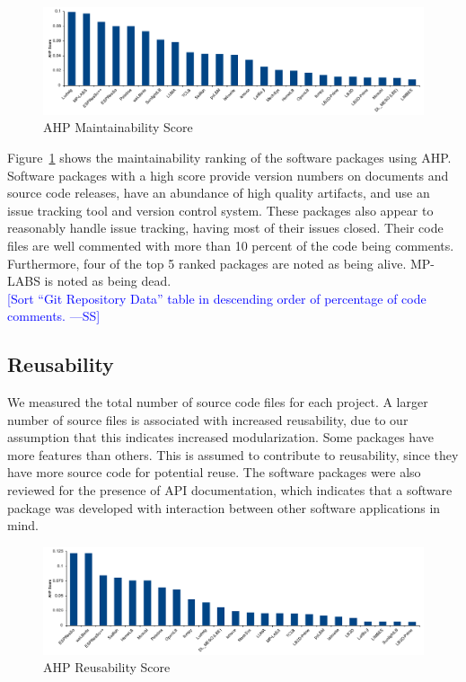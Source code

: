 \documentclass[final, 3p, times, authoryear]{elsarticle}
\newcommand{\authornote}[3]{\textcolor{#1}{[#3 ---#2]}}
\newcommand{\authornote}[3]{}
\newcommand{\wss}[1]{\authornote{blue}{SS}{#1}} %
\begin{document}
\begin{figure}[h!]
	\begin{center}
		\includegraphics[width=1.0\textwidth]{./figures/maintainability_chart.pdf}
		\caption{AHP Maintainability Score}
		\label{Fig_Maintainability}
	\end{center}
\end{figure}

Figure~\ref{Fig_Maintainability} shows the maintainability ranking of the
software packages using AHP. Software packages with a high score provide version
numbers on documents and source code releases, have an abundance of high quality
artifacts, and use an issue tracking tool and version control system. These
packages also appear to reasonably handle issue tracking, having most of their
issues closed. Their code files are well commented with more than 10 percent of
the code being comments. Furthermore, four of the top 5 ranked packages are
noted as being alive. MP-LABS is noted as being dead.\\

\wss{Sort ``Git Repository Data'' table in descending order of percentage of
code comments.}

\subsection{Reusability} \label{reusabilityresults}

We measured the total number of source code files for each project. A larger
number of source files is associated with increased reusability, due to our
assumption that this indicates increased modularization. Some packages have more
features than others.  This is assumed to contribute to reusability, since they have
more source code for potential reuse. The software packages were also reviewed
for the presence of API documentation, which indicates that a software package
was developed with interaction between other software applications in mind. 

\begin{figure}[h!]
	\begin{center}
		\includegraphics[width=1.0\textwidth]{./figures/reusability_chart.pdf}
		\caption{AHP Reusability Score}
		\label{Fig_Reusabilty}
	\end{center}
\end{figure}
\end{document}
